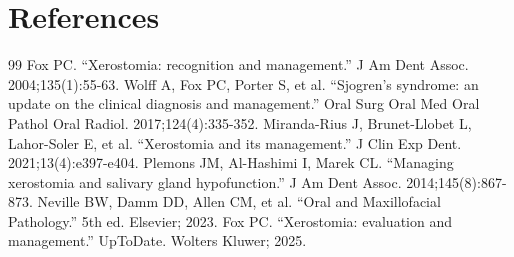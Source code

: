\section*{References}
\begin{thebibliography}{99}
 Fox PC. ``Xerostomia: recognition and management.'' J Am Dent Assoc. 2004;135(1):55-63.
 Wolff A, Fox PC, Porter S, et al. ``Sjogren's syndrome: an update on the clinical diagnosis and management.'' Oral Surg Oral Med Oral Pathol Oral Radiol. 2017;124(4):335-352.
 Miranda-Rius J, Brunet-Llobet L, Lahor-Soler E, et al. ``Xerostomia and its management.'' J Clin Exp Dent. 2021;13(4):e397-e404.
 Plemons JM, Al-Hashimi I, Marek CL. ``Managing xerostomia and salivary gland hypofunction.'' J Am Dent Assoc. 2014;145(8):867-873.
 Neville BW, Damm DD, Allen CM, et al. ``Oral and Maxillofacial Pathology.'' 5th ed. Elsevier; 2023.
 Fox PC. ``Xerostomia: evaluation and management.'' UpToDate. Wolters Kluwer; 2025.
\end{thebibliography}
